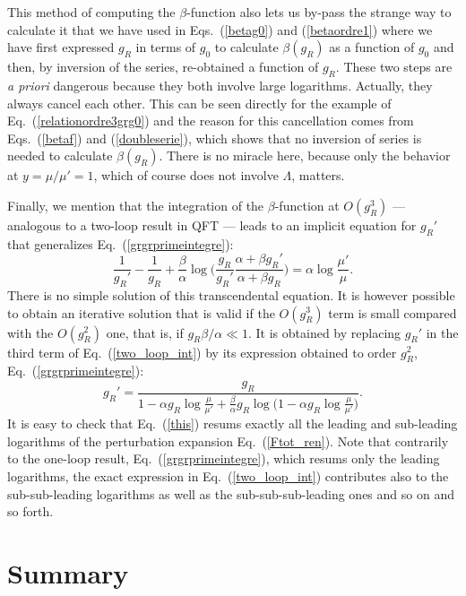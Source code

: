 \documentclass[floatfix,preprintnumbers,amsmath,amssymb,prb,12pt]{revtex4-1}
\begin{document}
{This method of computing the $\beta$-function also lets us by-pass
the strange way to calculate it that we have used in
Eqs.~(\ref{betag0}) and (\ref{betaordre1}) where we have first
expressed $g_R$ in terms of $g_0$ to calculate $\beta(g_R)$ as a
function of $g_0$ and then, by inversion of the series,
re-obtained a function of $g_R$. These two steps are {\em a
priori} dangerous because they both involve large logarithms.
Actually, they always cancel each other. This can be seen directly
for the example of Eq.~(\ref{relationordre3grg0}) and the 
reason for this cancellation comes from Eqs.~(\ref{betaf}) and
(\ref{doubleserie}), which shows that no inversion of series is
needed to calculate $\beta(g_R)$. There is no miracle here,
because only the behavior at
$y=\mu/\mu'=1$, which of course does not involve $\Lambda$,
matters.

Finally, we mention that the integration of the $\beta$-function at
$O(g_R^3)$ --- analogous to a two-loop result in QFT --- leads to
an implicit equation for $g_R'$ that generalizes
Eq.~(\ref{grgrprimeintegre}):
\begin{equation}
\frac{1}{g_R'}- \frac{1}{g_R} +\frac{\beta}{\alpha}
\log\big(\frac{g_R}{g_R'} \frac{\alpha +\beta g_R'}{\alpha +\beta
g_R} \big)=
\alpha\log\frac{\mu'}{\mu}.
\label{two_loop_int}
\end{equation}
There is no simple solution of this transcendental equation. It is
however possible to obtain an iterative solution that is valid if
the $O(g_R^3)$ term is small compared with the
$O(g_R^2)$ one, that is, if $g_R \beta/\alpha\ll 1$. It is
obtained by replacing $g_R'$ in the third term of
Eq.~(\ref{two_loop_int}) by its expression obtained to order
$g_R^2$, Eq.~(\ref{grgrprimeintegre}):
\begin{equation}
g_R'= \frac{g_R}{1-\alpha g_R \log\frac{\mu}{\mu'}
+\frac{\beta}{\alpha} g_R\log\big(1-\alpha g_R
\log\frac{\mu}{\mu'} \big)}.
\label{this}
\end{equation}
It is easy to check that Eq.~(\ref{this}) resums exactly all the
leading and sub-leading logarithms of the perturbation expansion
Eq.~(\ref{Ftot_ren}). Note that contrarily to the one-loop
result, Eq.~(\ref{grgrprimeintegre}), which resums only the
leading logarithms, the exact expression
in Eq.~(\ref{two_loop_int}) contributes also to the sub-sub-leading
logarithms as well as the sub-sub-sub-leading ones and so on and
so forth.

\section{Summary}

}
\end{document}
